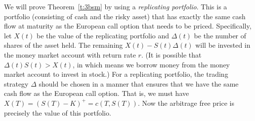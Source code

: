 We will prove Theorem~\ref{t:3bsm} by using a \emph{replicating portfolio}.
This is a portfolio (consisting of cash and the risky asset) that has exactly the same cash flow at maturity as the European call option that needs to be priced.
Specifically, let $X(t)$ be the value of the replicating portfolio and $\Delta(t)$ be the number of shares of the asset held.
The remaining $X(t) - S(t) \Delta(t)$ will be invested in the money market account with return rate $r$.
(It is possible that $\Delta(t) S(t) > X(t)$, in which means we borrow money from the money market account to invest in stock.)
For a replicating portfolio, the trading strategy $\Delta$ should be chosen in a manner that ensures that we have the same cash flow as the European call option.
That is, we must have $X(T) = (S(T) - K)^+ = c(T, S(T))$.
Now the arbitrage free price is precisely the value of this portfolio.

